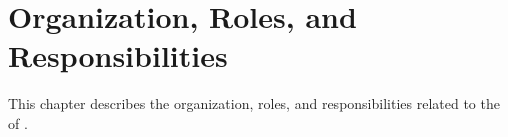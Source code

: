 
\chapter{Organization, Roles, and Responsibilities}
\label{loc:OrganizationRolesAndResponsibilities}


This chapter describes the organization, roles, and responsibilities related to the \CM of \ThisSystem.


